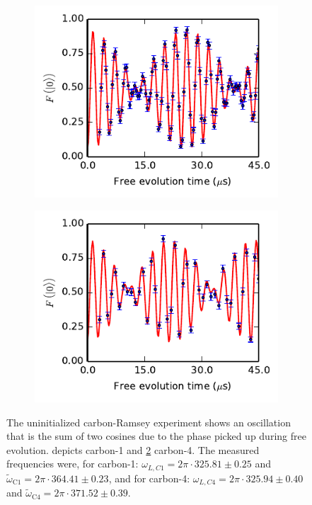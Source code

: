 \begin{figure}[htbp]
    \begin{subfigure}[t]{0.49\textwidth}\centering
        \caption{}
        \includegraphics{Img/CarbonRamsey_C1.pdf}
        \label{fig:CR_C1}
    \end{subfigure}
    \begin{subfigure}[t]{0.49\textwidth}\centering
        \caption{}
        \includegraphics{Img/CarbonRamsey_C4.pdf}
        \label{fig:CR_C4}
    \end{subfigure}
    \caption{The uninitialized carbon-Ramsey experiment shows an oscillation that is the sum of two cosines due to the phase picked up during free evolution.
     depicts carbon-1 and \cref{fig:CR_C4} carbon-4.
    The measured frequencies were, for carbon-1: $\omega_{L,C1} = 2\pi\cdot 325.81 \pm 0.25$ and  $\tilde \omega_{\mathrm{C1}}= 2\pi\cdot 364.41 \pm 0.23$, and for carbon-4: $\omega_{L,C4} =  2\pi\cdot 325.94 \pm 0.40$ and $\tilde \omega_{\mathrm{C4}} = 2\pi\cdot 371.52 \pm 0.39 $.}
    \label{fig:Uninitialized_carbon_ramsey}
\end{figure}

